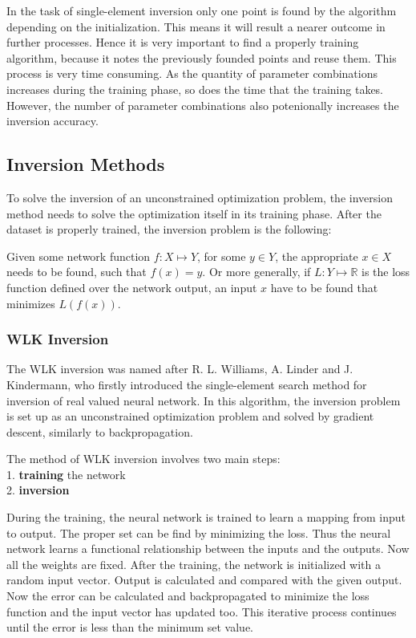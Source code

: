 In the task of single-element inversion only one point is found by the algorithm depending on the initialization. This means it will result a nearer outcome in further processes. Hence it is very important to find a properly training algorithm, because it notes the previously founded points and reuse them. This process is very time consuming. As the quantity of parameter combinations increases during the training phase, so does the time that the training takes. However, the number of parameter combinations also potenionally increases the inversion accuracy.



\subsection{Inversion Methods}

To solve the inversion of an unconstrained optimization problem, the inversion method needs to solve the optimization itself in its training phase. After the dataset is properly trained, the inversion problem is the following:\medskip

Given some network function $f : X \mapsto Y$, for some $y \in Y$, the appropriate $x \in X$ needs to be found, such that $f(x) = y$. Or more generally, if $L : Y \mapsto \mathbb{R}$ is the loss function defined over the network output, an input $x$ have to be found that minimizes $L(f(x))$. 


\subsubsection{WLK Inversion}

The WLK inversion was named after R. L. Williams, A. Linder and J.
Kindermann, who firstly introduced the single-element search method for inversion of real valued neural network. In this algorithm, the inversion problem is set up as an unconstrained optimization problem and solved by gradient descent, similarly to backpropagation. \medskip

\noindent The method of WLK inversion involves two main steps: \\
1. \textbf{training} the network \\
2. \textbf{inversion}\medskip

During the training, the neural network is trained to learn a mapping from input to output. The proper set can be find by minimizing the loss. Thus the neural network learns a functional relationship between the inputs and the outputs. Now all the weights are fixed. After the training, the network is initialized with a random input vector. Output is calculated and compared with the given output. Now the error can be calculated and backpropagated to minimize the loss function and the input vector has updated too. This iterative process continues until the error is less than the minimum set value.\medskip

